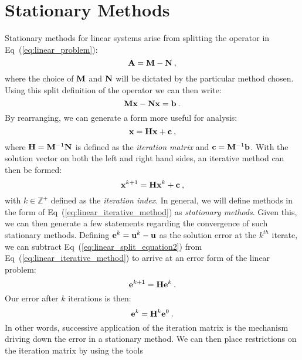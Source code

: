 \section{Stationary Methods}
\label{sec:stationary_methods}
Stationary methods for linear systems arise from splitting the
operator in Eq~(\ref{eq:linear_problem}):
\begin{equation}
  \mathbf{A} = \mathbf{M} - \mathbf{N}\:,
  \label{eq:split_linear_operator}
\end{equation}
where the choice of $\mathbf{M}$ and $\mathbf{N}$ will be dictated by the
particular method chosen. Using this split definition of the operator
we can then write:
\begin{equation}
  \mathbf{M}\mathbf{x} - \mathbf{N}\mathbf{x} = \mathbf{b}\:.
  \label{eq:linear_split_equation1}
\end{equation}
By rearranging, we can generate a form more useful for analysis:
\begin{equation}
  \mathbf{x} = \mathbf{H}\mathbf{x} + \mathbf{c}\:,
  \label{eq:linear_split_equation2}
\end{equation}
where $\mathbf{H}=\mathbf{M}^{-1}\mathbf{N}$ is defined as the \textit{iteration
  matrix} and $\mathbf{c}=\mathbf{M}^{-1}\mathbf{b}$. With the solution vector on
both the left and right hand sides, an iterative method can then be
formed:
\begin{equation}
    \mathbf{x}^{k+1} = \mathbf{H}\mathbf{x}^k + \mathbf{c}\:,
  \label{eq:linear_iterative_method}
\end{equation}
with $k \in \mathbb{Z}^+$ defined as the \textit{iteration index}. In
general, we will define methods in the form of
Eq~(\ref{eq:linear_iterative_method}) as \textit{stationary
  methods}. Given this, we can then generate a few statements
regarding the convergence of such stationary methods. Defining
$\mathbf{e}^k = \mathbf{u}^k - \mathbf{u}$ as the solution error at the
$k^{th}$ iterate, we can subtract Eq~(\ref{eq:linear_split_equation2})
from Eq~(\ref{eq:linear_iterative_method}) to arrive at an error form
of the linear problem:
\begin{equation}
  \mathbf{e}^{k+1} = \mathbf{H}\mathbf{e}^k\:. 
  \label{eq:linear_iterative_error}
\end{equation}
Our error after $k$ iterations is then:
\begin{equation}
  \mathbf{e}^{k} = \mathbf{H}^k\mathbf{e}^0\:. 
  \label{eq:linear_k_iter_error}
\end{equation}
In other words, successive application of the iteration matrix is the
mechanism driving down the error in a stationary method. We can then
place restrictions on the iteration matrix by using the tools
